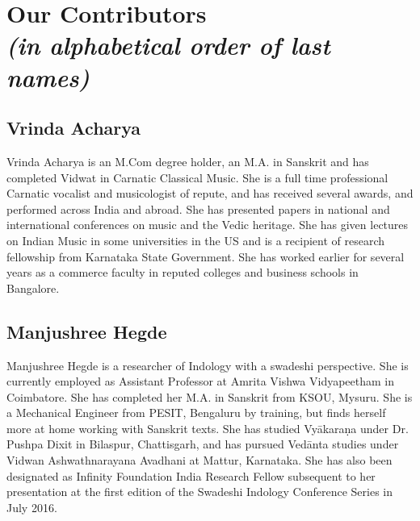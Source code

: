 \makeatletter
\def\@makeschapterhead#1{%
  \vspace*{50\p@}%
  {\parindent \z@ \raggedleft
    \normalfont
    \interlinepenalty\@M
    \LARGE \bfseries  #1\par\nobreak
    \vskip 20\p@
  }}
\makeatother

\chapter*{Our Contributors\\ {\rm\sl\small (in alphabetical order of last names)}}\label{contributors}


\chead[]{}
\cfoot[]{}

\section*{Vrinda Acharya}

Vrinda Acharya is an M.Com degree holder, an M.A. in Sanskrit and has completed Vidwat in Carnatic Classical Music. She is a full time professional Carnatic vocalist and musicologist of repute, and has received several awards, and performed across India and abroad. She has presented papers in national and international conferences on music and the Vedic heritage. She has given lectures on Indian Music in some universities in the US and is a recipient of research fellowship from Karnataka State Government. She has worked earlier for several years as a commerce faculty in reputed colleges and business schools in Bangalore.

\section*{Manjushree Hegde}

Manjushree Hegde is a researcher of Indology with a swadeshi perspective. She is currently employed as Assistant Professor at Amrita Vishwa Vidyapeetham in Coimbatore. She has completed her M.A. in Sanskrit from KSOU, Mysuru. She is a Mechanical Engineer from PESIT, Bengaluru by training, but finds herself more at home working with Sanskrit texts. She has studied Vyākaraṇa under Dr. Pushpa Dixit in Bilaspur, Chattisgarh, and has pursued Vedānta studies under Vidwan Ashwathnarayana Avadhani at Mattur, Karnataka. She has also been designated as Infinity Foundation India Research Fellow subsequent to her presentation at the first edition of the Swadeshi Indology Conference Series in July 2016.

